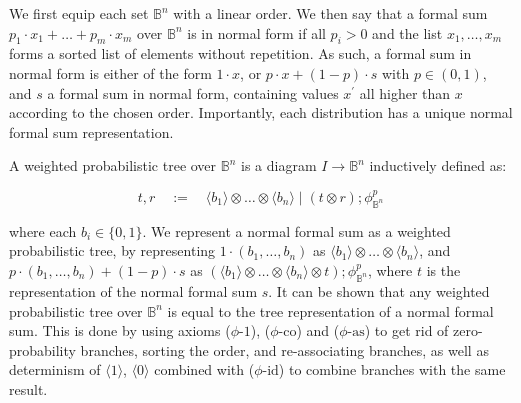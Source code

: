 \documentclass[10pt,a4paper]{article}
\begin{document}
 
 
We first equip each set $\mathbb{B}^{n}$ with a linear order. We then say that a formal sum $p_{1}\cdot x_{1}+\dots+p_{m}\cdot x_{m}$ over $\mathbb{B}^{n}$ is in normal form if all $p_{i}>0$ and the list $x_{1},\dots,x_{m}$ forms a sorted list of elements without repetition. As such, a formal sum in normal form is either of the form $1\cdot x$, or $p\cdot x+(1-p)\cdot s$ with $p\in(0,1)$, and $s$ a formal sum in normal form, containing values $x^{\prime}$ all higher than $x$ according to the chosen order. Importantly, each distribution has a unique normal formal sum representation.\par
 
 
 
A weighted probabilistic tree over $\mathbb{B}^{n}$ is a diagram $I\to\mathbb{B}^{n}$ inductively defined as:\par
  
\par  \quad  \[t,r\quad:=\quad\langle b_{1}\rangle\otimes\dots\otimes\langle b_{n}\rangle\mid(t\otimes r);\phi^{p}_{\mathbb{B}^{n}}\]\quad  \quad  
  
where each $b_{i}\in\{0,1\}$. We represent a normal formal sum as a weighted probabilistic tree, by representing $1\cdot(b_{1},\dots,b_{n})$ as $\langle b_{1}\rangle\otimes\dots\otimes\langle b_{n}\rangle$, and $p\cdot(b_{1},\dots,b_{n})+(1-p)\cdot s$ as $(\langle b_{1}\rangle\otimes\dots\otimes\langle b_{n}\rangle\otimes t);\phi^{p}_{\mathbb{B}^{n}}$, where $t$ is the representation of the normal formal sum $s$. It can be shown that any weighted probabilistic tree over $\mathbb{B}^{n}$ is equal to the tree representation of a normal formal sum. This is done by using axioms ($\phi\text{-1}$), ($\phi\text{-co}$) and ($\phi\text{-as}$) to get rid of zero-probability branches, sorting the order, and re-associating branches, as well as determinism of $\langle 1\rangle$, $\langle 0\rangle$ combined with ($\phi\text{-id}$) to combine branches with the same result.\par
 
 
 
\end{document}
